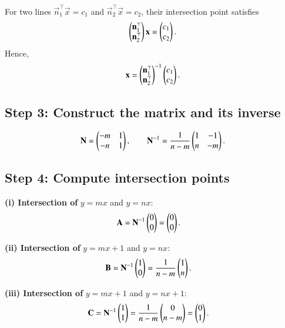 \documentclass[journal]{IEEEtran}
\begin{document}
For two lines 
\(\vec{n}_1^\top\vec{x} = c_1\) and \(\vec{n}_2^\top\vec{x} = c_2\),
their intersection point satisfies
\begin{align}
\begin{pmatrix}\mathbf{n}_1^\top \\ \mathbf{n}_2^\top\end{pmatrix}\mathbf{x} = \begin{pmatrix}c_1 \\ c_2\end{pmatrix}.
\end{align}
Hence,
\begin{align}
\mathbf{x} = \begin{pmatrix}\mathbf{n}_1^\top \\ \mathbf{n}_2^\top\end{pmatrix}^{-1} \begin{pmatrix}c_1 \\ c_2\end{pmatrix}.
\end{align}

\subsection*{Step 3: Construct the matrix and its inverse}

\begin{align}
\mathbf{N} = \begin{pmatrix}-m & 1 \\ -n & 1\end{pmatrix}, \qquad
\mathbf{N}^{-1} = \frac{1}{n - m}\begin{pmatrix}1 & -1 \\ n & -m\end{pmatrix}.
\end{align}

\subsection*{Step 4: Compute intersection points}

\noindent
\textbf{(i) Intersection of } \(y=mx\) and \(y=nx\):
\begin{align}
\mathbf{A} &= \mathbf{N}^{-1}\begin{pmatrix}0 \\ 0\end{pmatrix}
= \begin{pmatrix}0 \\ 0\end{pmatrix}.
\end{align}

\noindent
\textbf{(ii) Intersection of } \(y=mx+1\) and \(y=nx\):
\begin{align}
\mathbf{B} &= \mathbf{N}^{-1}\begin{pmatrix}1 \\ 0\end{pmatrix}
= \frac{1}{n - m}\begin{pmatrix}1 \\ n\end{pmatrix}.
\end{align}

\noindent
\textbf{(iii) Intersection of } \(y=mx+1\) and \(y=nx+1\):
\begin{align}
\mathbf{C} &= \mathbf{N}^{-1}\begin{pmatrix}1 \\ 1\end{pmatrix}
= \frac{1}{n - m}\begin{pmatrix}0 \\ n - m\end{pmatrix}
= \begin{pmatrix}0 \\ 1\end{pmatrix}.
\end{align}
\end{document}

